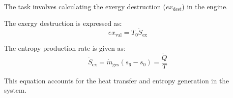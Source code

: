 The task involves calculating the exergy destruction (\( ex_{\text{dest}} \)) in the engine.

The exergy destruction is expressed as:  
\[
ex_{\text{val}} = T_0 \dot{S}_{\text{ex}}
\]  

The entropy production rate is given as:  
\[
\dot{S}_{\text{ex}} = \dot{m}_{\text{ges}} (s_6 - s_0) = \frac{\dot{Q}}{T}
\]  

This equation accounts for the heat transfer and entropy generation in the system.